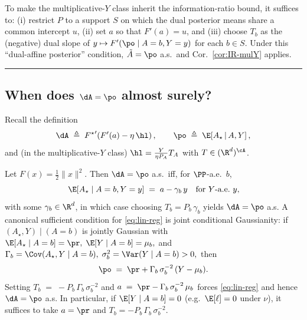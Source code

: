 \begin{remark}
    To make the multiplicative-$Y$ class inherit the information-ratio bound, it suffices to:
    (i) restrict $P$ to a support $S$ on which the dual posterior means share a common intercept $u$,
    (ii) set $a$ so that $F'(a)=u$, and (iii) choose $T_b$ as the (negative) dual slope
    of $y\mapsto F'(\po\mid A=b,Y=y)$ for each $b\in S$. Under this “dual-affine posterior”
    condition, $\tilde{A}=\po$ a.s.\ and Cor.~\ref{cor:IR-mulY} applies.
\end{remark}

\hrule

\subsection*{When does $\dA=\po$ almost surely?}

Recall the definition
\[
    \dA \;\triangleq\; {F^\star}'\!\left(F'(a)-\eta\,\hl\right),
    \qquad
    \po \;\triangleq\; \E\!\left[A_\star \,\middle|\, A, Y\right],
\]
and (in the multiplicative-$Y$ class) $\hl=\frac{Y}{\eta P_A}T_A$ with $T\in(\R^d)^{\cA}$.

\begin{corollary}
    \label{cor:quad-linear}
    Let $F(x)=\tfrac12\|x\|^2$. Then $\dA=\po$ a.s.\ iff, for $\PP$-a.e.\ $b$,
    \begin{equation}
        \label{eq:lin-reg}
        \E[A_\star\mid A=b,Y=y] \;=\; a - \gamma_b\,y
        \quad\text{for $Y$-a.e.\ $y$,}
    \end{equation}
    with some $\gamma_b\in\R^{d}$, in which case choosing $T_b=P_b\,\gamma_b$ yields $\dA=\po$ a.s.
    A canonical sufficient condition for \eqref{eq:lin-reg} is joint conditional Gaussianity:
    if $(A_\star,Y)\mid(A=b)$ is jointly Gaussian with
    \(
    \E[A_\star\mid A=b]=\pr,\;
    \E[Y\mid A=b]=\mu_b,
    \)
    and
    \(
    \Gamma_b=\Cov(A_\star,Y\mid A=b),\;
    \sigma_b^2=\Var(Y\mid A=b)>0,
    \)
    then
    \[
        \po \;=\; \pr + \Gamma_b\,\sigma_b^{-2}\,(Y-\mu_b).
    \]
    Setting
    \(
    T_b \;=\; -P_b\,\Gamma_b\,\sigma_b^{-2}
    \)
    and
    \(
    a \;=\; \pr - \Gamma_b\,\sigma_b^{-2}\,\mu_b
    \)
    forces \eqref{eq:lin-reg} and hence $\dA=\po$ a.s.
    In particular, if $\E[Y\mid A=b]=0$ (e.g.\ $\E[\ell]=0$ under $\nu$), it suffices to take $a=\pr$ and $T_b=-P_b\,\Gamma_b\,\sigma_b^{-2}$.
\end{corollary}

